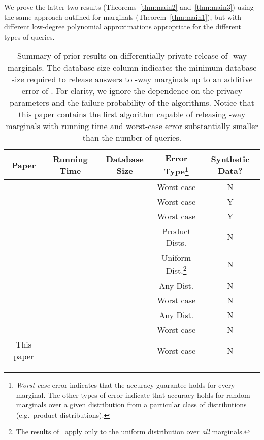 \documentclass[11pt]{article}
\theoremstyle{definition}
\begin{document}
We prove the latter two results (Theorems~\ref{thm:main2} and~\ref{thm:main3}) using the same approach outlined for marginals (Theorem~\ref{thm:main1}), but with different low-degree polynomial approximations appropriate for the different types of queries.
\begin{table}
\begin{minipage}[center]{\textwidth}
\begin{center}
\begin{tabular}{|c|c|c|c|c|}
\hline
Paper & Running Time  & Database Size & Error Type\footnote{\emph{Worst case} error indicates that the accuracy guarantee holds for every marginal.  The other types of error indicate that accuracy holds for random marginals over a given distribution from a particular class of distributions (e.g.~product distributions).} & Synthetic Data? \\
\hline
\cite{DinurNi03,DworkNi04,BlumDwMcNi05,DworkMcNiSm06} & &  & Worst case & N \\
\cite{BarakChDwKaMcTa07}  &  &  & Worst case & Y \\
\cite{BlumLiRo08,DworkNaReRoVa09,DworkRoVa10,HardtLiMc10}&  &  & Worst case & Y \\
\cite{GuptaHaRoUl11} &  &  & Product Dists. & N\\
\cite{CheraghchiKlKoLe12} &  &  & Uniform Dist.\footnote{The results of~\cite{CheraghchiKlKoLe12} apply only to the uniform distribution over \emph{all} marginals.} & N \\
\cite{HardtRoSe12} &  &  &Any Dist. & N \\
\cite{HardtRoSe12} &  &  & Worst case & N \\
\cite{HardtRoSe12} &  &  & Any Dist. & N \\
\cite{HardtRoSe12} &  &  & Worst case & N  \\
This paper &  & & Worst case & N \\
\hline
\end{tabular}
\caption{Summary of prior results on differentially private release of -way marginals.  The database size column indicates the minimum database size required to release answers to -way marginals up to an additive error of .  For clarity, we ignore the dependence on the privacy parameters and the failure probability of the algorithms.  Notice that this paper contains the first algorithm capable of releasing -way marginals with running time and worst-case error substantially smaller than the number of queries.}
\end{center}
\end{minipage}
\end{table}
\end{document}

